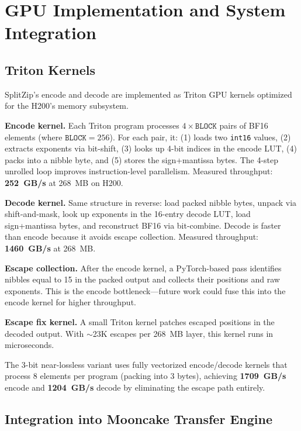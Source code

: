 \section{GPU Implementation and System Integration}
\label{sec:impl}

\subsection{Triton Kernels}

SplitZip's encode and decode are implemented as Triton GPU kernels optimized for the H200's memory subsystem.

\textbf{Encode kernel.} Each Triton program processes $4 \times \texttt{BLOCK}$ pairs of BF16 elements (where $\texttt{BLOCK}=256$). For each pair, it: (1) loads two \texttt{int16} values, (2) extracts exponents via bit-shift, (3) looks up 4-bit indices in the encode LUT, (4) packs into a nibble byte, and (5) stores the sign+mantissa bytes. The 4-step unrolled loop improves instruction-level parallelism. Measured throughput: \textbf{252~GB/s} at 268~MB on H200.

\textbf{Decode kernel.} Same structure in reverse: load packed nibble bytes, unpack via shift-and-mask, look up exponents in the 16-entry decode LUT, load sign+mantissa bytes, and reconstruct BF16 via bit-combine. Decode is faster than encode because it avoids escape collection. Measured throughput: \textbf{1460~GB/s} at 268~MB.

\textbf{Escape collection.} After the encode kernel, a PyTorch-based pass identifies nibbles equal to 15 in the packed output and collects their positions and raw exponents. This is the encode bottleneck---future work could fuse this into the encode kernel for higher throughput.

\textbf{Escape fix kernel.} A small Triton kernel patches escaped positions in the decoded output. With $\sim$23K escapes per 268~MB layer, this kernel runs in microseconds.

The 3-bit near-lossless variant uses fully vectorized encode/decode kernels that process 8 elements per program (packing into 3 bytes), achieving \textbf{1709~GB/s} encode and \textbf{1204~GB/s} decode by eliminating the escape path entirely.

\subsection{Integration into Mooncake Transfer Engine}

